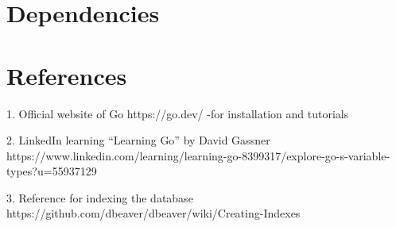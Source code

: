 \documentclass{article}
\begin{document}
\section{Dependencies}

\section{References}

1. Official website of Go https://go.dev/
-for installation and tutorials

2. LinkedIn learning “Learning Go” by David Gassner
https://www.linkedin.com/learning/learning-go-8399317/explore-go-s-variable-types?u=55937129

3. Reference for indexing the database
https://github.com/dbeaver/dbeaver/wiki/Creating-Indexes
\end{document}

